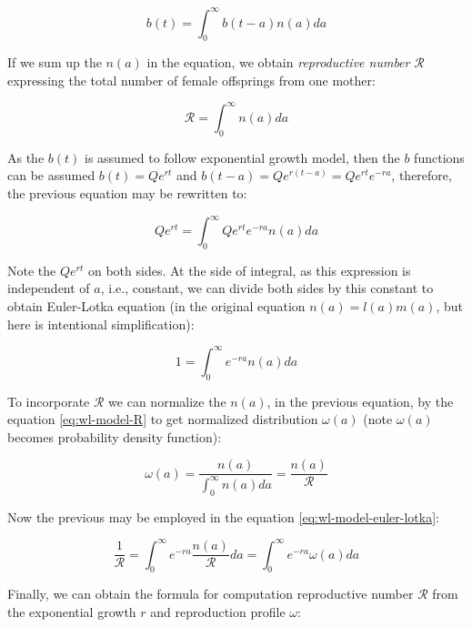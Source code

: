 \documentclass[
  digital, %
  oneside, %
  lof,     %
  lot,     %
]{fithesis4}
\begin{document}
\begin{equation}\label{eq:wl-model-renewal}
  b(t) = \int_{0}^{\infty} b(t - a) n(a) da
\end{equation}

If we sum up the $n(a)$ in the equation, we obtain \textit{reproductive number} 
$\mathcal{R}$ expressing the total number of female offsprings from one mother:

\begin{equation}\label{eq:wl-model-R}
  \mathcal{R} = \int_0^{\infty} n(a) da
\end{equation}

As the $b(t)$ is assumed to follow exponential growth model, then 
the $b$ functions can be assumed $b(t) = Q e^{rt}$ and 
$b(t - a) = Q e^{r(t - a)} = Q e^{rt} e^{-ra}$, therefore,
the previous equation may be rewritten to:

\begin{equation}
  Q e^{rt} = \int_{0}^{\infty} Q e^{rt} e^{-ra} n(a) da
\end{equation}

Note the $Q e^{rt}$ on both sides. At the side of integral, 
as this expression is independent of $a$, i.e., constant, we can 
divide both sides by this constant to obtain Euler-Lotka
equation (in the original equation $n(a) = l(a) m(a)$, but 
here is intentional simplification):

\begin{equation}\label{eq:wl-model-euler-lotka}
  1 = \int_{0}^{\infty} e^{-ra} n(a) da
\end{equation}

To incorporate $\mathcal{R}$ we can normalize the $n(a)$, in the
previous equation, by the equation \eqref{eq:wl-model-R} to get
normalized distribution $\omega(a)$ (note $\omega(a)$ becomes 
probability density function):

\begin{equation}
  \omega(a) = \frac{n(a)}{\int_0^{\infty} n(a) da} = \frac{n(a)}{\mathcal{R}}
\end{equation}

Now the previous may be employed in the equation \eqref{eq:wl-model-euler-lotka}:

\begin{equation}\label{eq:wl-model-euler-lotka-R}
  \frac{1}{\mathcal{R}} = \int_{0}^{\infty} e^{-ra} \frac{n(a)}{\mathcal{R}} da = \int_{0}^{\infty} e^{-ra} \omega(a) da
\end{equation}

Finally, we can obtain the formula for computation reproductive number
$\mathcal{R}$ from the exponential growth $r$ and reproduction profile $\omega$:
\end{document}
